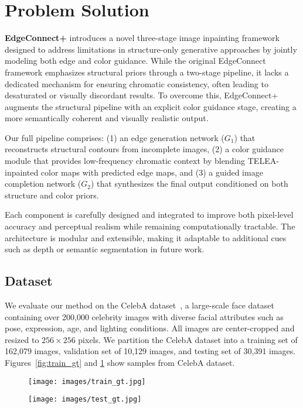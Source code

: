 \section{Problem Solution}
\label{sec:problem_solution}

\textbf{EdgeConnect+} introduces a novel three-stage image inpainting framework designed to address limitations in structure-only generative approaches by jointly modeling both edge and color guidance. While the original EdgeConnect framework emphasizes structural priors through a two-stage pipeline, it lacks a dedicated mechanism for ensuring chromatic consistency, often leading to desaturated or visually discordant results. To overcome this, EdgeConnect+ augments the structural pipeline with an explicit color guidance stage, creating a more semantically coherent and visually realistic output.

Our full pipeline comprises: 
(1) an edge generation network (\(G_1\)) that reconstructs structural contours from incomplete images, 
(2) a color guidance module that provides low-frequency chromatic context by blending TELEA-inpainted color maps with predicted edge maps, and 
(3) a guided image completion network (\(G_2\)) that synthesizes the final output conditioned on both structure and color priors.

Each component is carefully designed and integrated to improve both pixel-level accuracy and perceptual realism while remaining computationally tractable. The architecture is modular and extensible, making it adaptable to additional cues such as depth or semantic segmentation in future work.

\subsection{Dataset}

We evaluate our method on the CelebA dataset~\cite{liu2015deep}, a large-scale face dataset containing over 200,000 celebrity images with diverse facial attributes such as pose, expression, age, and lighting conditions. All images are center-cropped and resized to $256 \times 256$ pixels. We partition the CelebA dataset into a training set of 162,079 images, validation set of 10,129 images, and testing set of 30,391 images. Figures~\ref{fig:train_gt} and \ref{fig:test_gt} show samples from CelebA dataset.
  
\begin{figure}[h!]
    \centering
    \begin{minipage}{0.22\textwidth}
        \centering
        \texttt{[image: images/train\_gt.jpg]}
        \caption{}
        \label{fig:train_gt} 
    \end{minipage}\hfill
    \begin{minipage}{0.22\textwidth}
        \centering
        \texttt{[image: images/test\_gt.jpg]}
        \caption{}
        \label{fig:test_gt}
    \end{minipage}
\end{figure}

